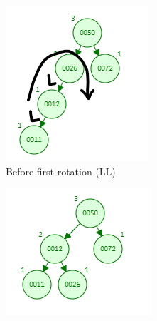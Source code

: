 \documentclass[12pt, a4paper]{article}
\begin{document}
\begin{enumerate}
    \begin{figure}[h!]
      \centering
      \begin{subfigure}[b]{0.3\textwidth}
        \centering
        \includegraphics[width=\textwidth]{1-1-a}
        \caption{Before first rotation (LL)}
        \label{fig:1-1-a}
      \end{subfigure}
      \hfill
      \begin{subfigure}[b]{0.3\textwidth}
        \centering
        \includegraphics[width=\textwidth]{1-1-b}

\end{subfigure}
\end{figure}
\end{enumerate}
\end{document}
